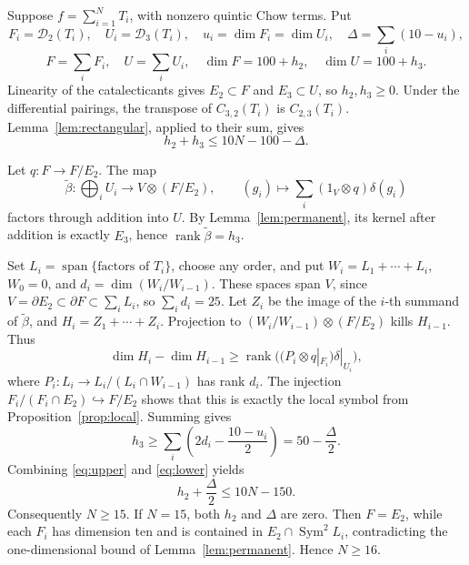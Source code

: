 \documentclass[11pt]{amsart}
\theoremstyle{definition}
\numberwithin{equation}{section}
\newcommand{\Sym}{\operatorname{Sym}}
\newcommand{\Span}{\operatorname{span}}
\newcommand{\rank}{\operatorname{rank}}
\newcommand{\cD}{\mathcal D}
\begin{document}
Suppose \(f=\sum_{i=1}^N T_i\), with nonzero quintic Chow terms. Put
\[
 F_i=\cD_2(T_i),\quad U_i=\cD_3(T_i),\quad u_i=\dim F_i=\dim U_i,
 \quad \Delta=\sum_i(10-u_i),
\]
\[
 F=\sum_iF_i,\quad U=\sum_iU_i,\quad
 \dim F=100+h_2,\quad \dim U=100+h_3.
\]
Linearity of the catalecticants gives \(E_2\subset F\) and
\(E_3\subset U\), so \(h_2,h_3\ge0\). Under the differential pairings,
the transpose of \(C_{3,2}(T_i)\) is \(C_{2,3}(T_i)\).
Lemma~\ref{lem:rectangular}, applied to their sum, gives
\begin{equation}\label{eq:upper}
 h_2+h_3\le10N-100-\Delta.
\end{equation}

Let \(q:F\to F/E_2\). The map
\[
 \widetilde\beta:\bigoplus_iU_i\longrightarrow V\otimes(F/E_2),
 \qquad (g_i)\longmapsto\sum_i(1_V\otimes q)\delta(g_i)
\]
factors through addition into \(U\). By Lemma~\ref{lem:permanent}, its
kernel after addition is exactly \(E_3\), hence
\(\rank\widetilde\beta=h_3\).

Set \(L_i=\Span\{\text{factors of }T_i\}\), choose any order, and put
\(W_i=L_1+\cdots+L_i\), \(W_0=0\), and
\(d_i=\dim(W_i/W_{i-1})\). These spaces span \(V\), since
\(V=\partial E_2\subset\partial F\subset\sum_iL_i\), so
\(\sum_i d_i=25\). Let \(Z_i\) be the image of the \(i\)-th summand
of \(\widetilde\beta\), and \(H_i=Z_1+\cdots+Z_i\). Projection to
\((W_i/W_{i-1})\otimes(F/E_2)\) kills \(H_{i-1}\). Thus
\[
 \dim H_i-\dim H_{i-1}\ge
 \rank\bigl((P_i\otimes q|_{F_i})\delta|_{U_i}\bigr),
\]
where \(P_i:L_i\to L_i/(L_i\cap W_{i-1})\) has rank \(d_i\).
The injection \(F_i/(F_i\cap E_2)\hookrightarrow F/E_2\) shows that
this is exactly the local symbol from Proposition~\ref{prop:local}.
Summing gives
\begin{equation}\label{eq:lower}
 h_3\ge\sum_i\left(2d_i-\frac{10-u_i}{2}\right)
 =50-\frac\Delta2.
\end{equation}
Combining \eqref{eq:upper} and \eqref{eq:lower} yields
\[h_2+\frac\Delta2\le10N-150.\]
Consequently \(N\ge15\). If \(N=15\), both \(h_2\) and \(\Delta\)
are zero. Then \(F=E_2\), while each \(F_i\) has dimension ten and is
contained in \(E_2\cap\Sym^2L_i\), contradicting the one-dimensional
bound of Lemma~\ref{lem:permanent}. Hence \(N\ge16\).
\end{document}
